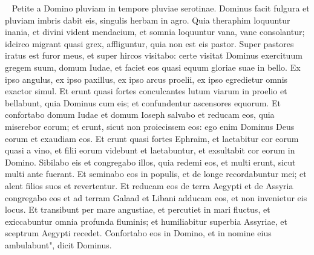 \begin{biblechapter}    
\verse Petite a Domino pluviam in tempore pluviae serotinae. Dominus facit fulgura et pluviam imbris dabit eis, singulis herbam in agro. 
\verse Quia theraphim loquuntur inania, et divini vident mendacium, et somnia loquuntur vana, vane consolantur; idcirco migrant quasi grex, affliguntur, quia non est eis pastor. 
\verse Super pastores iratus est furor meus, et super hircos visitabo: certe visitat Dominus exercituum gregem suum, domum Iudae, et faciet eos quasi equum gloriae suae in bello. 
\verse Ex ipso angulus, ex ipso paxillus, ex ipso arcus proelii, ex ipso egredietur omnis exactor simul. 
\verse Et erunt quasi fortes conculcantes lutum viarum in proelio et bellabunt, quia Dominus cum eis; et confundentur ascensores equorum. 
\verse Et confortabo domum Iudae et domum Ioseph salvabo et reducam eos, quia miserebor eorum; et erunt, sicut non proiecissem eos: ego enim Dominus Deus eorum et exaudiam eos. 
\verse Et erunt quasi fortes Ephraim, et laetabitur cor eorum quasi a vino, et filii eorum videbunt et laetabuntur, et exsultabit cor eorum in Domino. 
\verse Sibilabo eis et congregabo illos, quia redemi eos, et multi erunt, sicut multi ante fuerant. 
\verse Et seminabo eos in populis, et de longe recordabuntur mei; et alent filios suos et revertentur. 
\verse Et reducam eos de terra Aegypti et de Assyria congregabo eos et ad terram Galaad et Libani adducam eos, et non invenietur eis locus. 
\verse Et transibunt per mare angustiae, et percutiet in mari fluctus, et exiccabuntur omnia profunda fluminis; et humiliabitur superbia Assyriae, et sceptrum Aegypti recedet. 
\verse Confortabo eos in Domino, et in nomine eius ambulabunt", dicit Dominus. 
\end{biblechapter}

